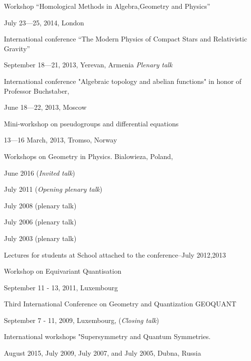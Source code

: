 \documentclass[12pt]{article}
\def\m {\medskip}
\begin{document}
\noindent Workshop ``Homological Methods in Algebra,Geometry 
and Physics''
    
  July 23---25, 2014, London 

\m


\noindent  International conference 
``The Modern Physics of Compact Stars and Relativistic Gravity''
 
      September 18---21, 2013, Yerevan, Armenia {\it Plenary talk} 

\m

\noindent  International conference  "Algebraic topology and 
abelian functions" in honor of Professor Buchstaber, 

     June 18---22, 2013, Moscow
  
\m

\noindent Mini-workshop on pseudogroups and differential equations

            13---16 March, 2013, Tromso, Norway 
\m

\noindent Workshops on Geometry 
    in Physics. Bialowieza, Poland,

        June 2016 ({\it Invited  talk}) 
        
         July 2011 ({\it Opening plenary talk}) 
     
        July 2008 (plenary talk)       
    
        July 2006 (plenary talk)
      
       July 2003 (plenary talk) 



  
\noindent Lectures for students at School attached to 
the conference--July 2012,2013        

\m




\noindent Workshop on Equivariant Quantisation 
     
           September 11 - 13, 2011, Luxembourg 

\m
 
\noindent Third International Conference on Geometry and 
     Quantization GEOQUANT

       September 7 - 11, 2009, Luxembourg,  ({\it Closing talk}) 

\m

\noindent  International workshops "Supersymmetry and Quantum
Symmetries. 

  August 2015, July 2009, July 2007, and July 2005, Dubna, Russia 


\m
\end{document}
